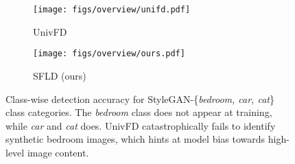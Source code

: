 \begin{figure}[t]
    \centering
    \begin{subfigure}[t]{0.48\columnwidth}
        \centering
        \texttt{[image: figs/overview/unifd.pdf]}
        \caption{UnivFD\cite{ojha2023towards}}
        \label{fig:univfd}
    \end{subfigure}
    \begin{subfigure}[t]{0.48\columnwidth}
        \centering
        \texttt{[image: figs/overview/ours.pdf]}
        \caption{SFLD (ours)}
        \label{fig:ours}
    \end{subfigure}
    \caption{Class-wise detection accuracy for StyleGAN-\{\textit{bedroom, car, cat}\} class categories. The \textit{bedroom} class does not appear at training, while \textit{car} and \textit{cat} does. UnivFD\cite{ojha2023towards} catastrophically fails to identify synthetic bedroom images, which hints at model bias towards high-level image content.}
    \label{fig:overview}
\end{figure}